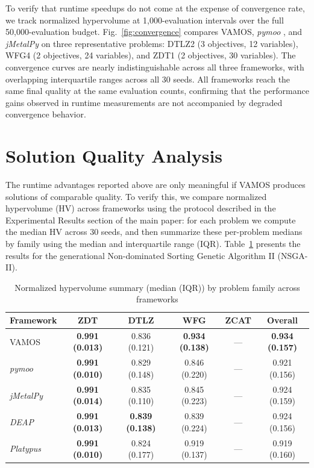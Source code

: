 \documentclass[final,5p,times,twocolumn]{elsarticle}
\newcommand{\VAMOS}{VAMOS}
\begin{document}
To verify that runtime speedups do not come at the expense of convergence rate, we track normalized hypervolume at 1{,}000-evaluation intervals over the full 50{,}000-evaluation budget. Fig.~\ref{fig:convergence} compares \VAMOS{}, \textit{pymoo} , and \textit{jMetalPy} on three representative problems: DTLZ2 (3 objectives, 12 variables), WFG4 (2 objectives, 24 variables), and ZDT1 (2 objectives, 30 variables). The convergence curves are nearly indistinguishable across all three frameworks, with overlapping interquartile ranges across all 30 seeds. All frameworks reach the same final quality at the same evaluation counts, confirming that the performance gains observed in runtime measurements are not accompanied by degraded convergence behavior.


\section{Solution Quality Analysis}
\label{app:quality}
The runtime advantages reported above are only meaningful if \VAMOS{} produces solutions of comparable quality. To verify this, we compare normalized hypervolume (HV) across frameworks using the protocol described in the Experimental Results section of the main paper: for each problem we compute the median HV across 30 seeds, and then summarize these per-problem medians by family using the median and interquartile range (IQR). Table~\ref{tab:frameworks_hv} presents the results for the generational Non-dominated Sorting Genetic Algorithm II (NSGA-II).

\begin{table}[htbp]
\centering
\caption{Normalized hypervolume summary (median (IQR)) by problem family across frameworks}
\label{tab:frameworks_hv}
\begin{tabular}{@{}lccccc@{}}
\toprule
\textbf{Framework} & \textbf{ZDT} & \textbf{DTLZ} & \textbf{WFG} & \textbf{ZCAT} & \textbf{Overall} \\
\midrule
VAMOS & \textbf{0.991 (0.013)} & 0.836 (0.121) & \textbf{0.934 (0.138)} & --- & \textbf{0.934 (0.157)} \\
\textit{pymoo} & \textbf{0.991 (0.010)} & 0.829 (0.148) & 0.846 (0.220) & --- & 0.921 (0.156) \\
\textit{jMetalPy} & \textbf{0.991 (0.014)} & 0.835 (0.110) & 0.845 (0.223) & --- & 0.924 (0.159) \\
\textit{DEAP} & \textbf{0.991 (0.013)} & \textbf{0.839 (0.138)} & 0.839 (0.224) & --- & 0.924 (0.156) \\
\textit{Platypus} & \textbf{0.991 (0.010)} & 0.824 (0.177) & 0.919 (0.137) & --- & 0.919 (0.160) \\
\bottomrule
\end{tabular}
\end{table}
\end{document}
